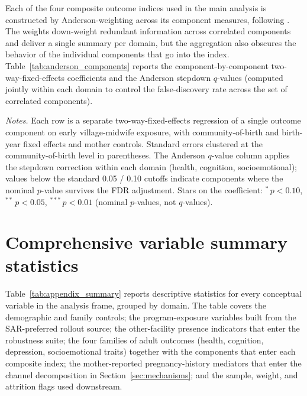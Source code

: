 Each of the four composite outcome indices used in the main analysis is constructed by Anderson-weighting across its component measures, following \textcite{anderson2008}.
The weights down-weight redundant information across correlated components and deliver a single summary per domain, but the aggregation also obscures the behavior of the individual components that go into the index.
Table~\ref{tab:anderson_components} reports the component-by-component two-way-fixed-effects coefficients and the Anderson stepdown $q$-values (computed jointly within each domain to control the false-discovery rate across the set of correlated components).

\begin{table}[!htbp]
\centering
\caption{Disaggregated outcome components and Anderson $q$-values.}
\label{tab:anderson_components}
\resizebox{\textwidth}{!}{}
\begin{minipage}{0.97\textwidth}
\footnotesize
\emph{Notes.}
Each row is a separate two-way-fixed-effects regression of a single outcome component on early village-midwife exposure, with community-of-birth and birth-year fixed effects and mother controls.
Standard errors clustered at the community-of-birth level in parentheses.
The Anderson $q$-value column applies the \textcite{anderson2008} stepdown correction within each domain (health, cognition, socioemotional); values below the standard 0.05 / 0.10 cutoffs indicate components where the nominal $p$-value survives the FDR adjustment.
Stars on the coefficient: $^{*}\,p<0.10$, $^{**}\,p<0.05$, $^{***}\,p<0.01$ (nominal $p$-values, not $q$-values).
\end{minipage}
\end{table}


\section{Comprehensive variable summary statistics}
\label{app:summary_stats}

Table~\ref{tab:appendix_summary} reports descriptive statistics for every conceptual variable in the analysis frame, grouped by domain.
The table covers the demographic and family controls; the program-exposure variables built from the SAR-preferred rollout source; the other-facility presence indicators that enter the robustness suite; the four families of adult outcomes (health, cognition, depression, socioemotional traits) together with the components that enter each composite index; the mother-reported pregnancy-history mediators that enter the channel decomposition in Section~\ref{sec:mechanisms}; and the sample, weight, and attrition flags used downstream.

